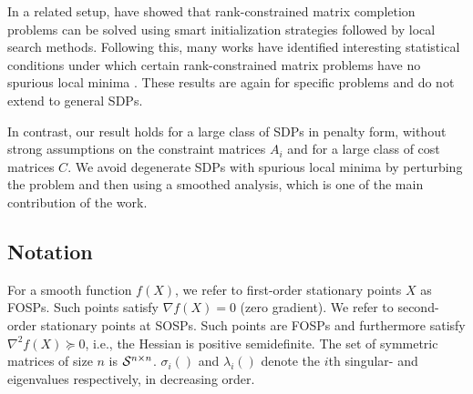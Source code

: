 In a related setup, \citet{keshavan2010matrix, jain2013low} have showed that rank-constrained matrix completion problems can be solved using smart initialization strategies followed by local search methods. Following this, many works have identified interesting statistical conditions under which certain rank-constrained matrix problems have no spurious local minima \citep{ sun2016geometric, bandeira2016low, ge2016matrix, bhojanapalli2016global, park2017non, ge2017no, zhu2017global, ge2017optimization}.  These results are again for specific problems and do not extend to general SDPs.

In contrast, our result holds for a large class of SDPs in penalty form, without strong assumptions on the constraint matrices $A_i$ and for a large class of cost matrices $C$. We avoid degenerate SDPs with spurious local minima by perturbing the problem and then using a smoothed analysis, which is one of the main contribution of the work. 



\subsection*{Notation}

For a smooth function $f(X)$, we refer to first-order stationary points $X$ as FOSPs. Such points satisfy $\nabla f(X) = 0$ (zero gradient). We refer to second-order stationary points at SOSPs. Such points are FOSPs and furthermore satisfy $\nabla^2 f(X) \succeq 0$, i.e., the Hessian is positive semidefinite. The set of symmetric matrices of size $n$ is $\mathcal{S}^{n\times n}$. $\sigma_i()$  and $\lambda_i()$ denote the $i$th singular- and eigenvalues respectively, in decreasing order.
